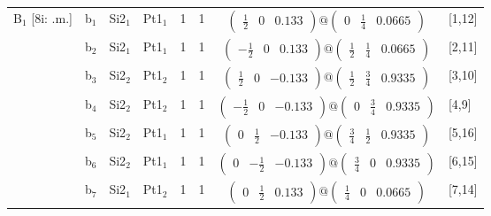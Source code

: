 \documentclass[fleqn,10pt,landscape]{article}
\begin{document}
\begin{itemize}
\begin{center}
\begin{longtable}{cc|cc|c|c|c|l}
B$_{1}$ [8i: .m.] & b$_{1}$ & Si2$_{1}$ & Pt1$_{1}$ & 1 & 1 & $\begin{pmatrix} \frac{1}{2} & 0 & 0.133 \end{pmatrix}@\begin{pmatrix} 0 & \frac{1}{4} & 0.0665 \end{pmatrix}$ & [1,12] \\
& b$_{2}$ & Si2$_{1}$ & Pt1$_{1}$ & 1 & 1 & $\begin{pmatrix} - \frac{1}{2} & 0 & 0.133 \end{pmatrix}@\begin{pmatrix} \frac{1}{2} & \frac{1}{4} & 0.0665 \end{pmatrix}$ & [2,11] \\
& b$_{3}$ & Si2$_{2}$ & Pt1$_{2}$ & 1 & 1 & $\begin{pmatrix} \frac{1}{2} & 0 & -0.133 \end{pmatrix}@\begin{pmatrix} \frac{1}{2} & \frac{3}{4} & 0.9335 \end{pmatrix}$ & [3,10] \\
& b$_{4}$ & Si2$_{2}$ & Pt1$_{2}$ & 1 & 1 & $\begin{pmatrix} - \frac{1}{2} & 0 & -0.133 \end{pmatrix}@\begin{pmatrix} 0 & \frac{3}{4} & 0.9335 \end{pmatrix}$ & [4,9] \\
& b$_{5}$ & Si2$_{2}$ & Pt1$_{1}$ & 1 & 1 & $\begin{pmatrix} 0 & \frac{1}{2} & -0.133 \end{pmatrix}@\begin{pmatrix} \frac{3}{4} & \frac{1}{2} & 0.9335 \end{pmatrix}$ & [5,16] \\
& b$_{6}$ & Si2$_{2}$ & Pt1$_{1}$ & 1 & 1 & $\begin{pmatrix} 0 & - \frac{1}{2} & -0.133 \end{pmatrix}@\begin{pmatrix} \frac{3}{4} & 0 & 0.9335 \end{pmatrix}$ & [6,15] \\
& b$_{7}$ & Si2$_{1}$ & Pt1$_{2}$ & 1 & 1 & $\begin{pmatrix} 0 & \frac{1}{2} & 0.133 \end{pmatrix}@\begin{pmatrix} \frac{1}{4} & 0 & 0.0665 \end{pmatrix}$ & [7,14] \\

\end{longtable}
\end{center}
\end{itemize}
\end{document}
